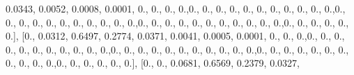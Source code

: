 \documentclass[
]{book}
\newenvironment{Shaded}{\begin{snugshade}}{\end{snugshade}}
\newcommand{\FloatTok}[1]{\textcolor[rgb]{0.00,0.00,0.81}{#1}}
\newcommand{\NormalTok}[1]{#1}
\begin{document}
\begin{Shaded}
\begin{Highlighting}[]
\FloatTok{0.0343}\NormalTok{, }\FloatTok{0.0052}\NormalTok{, }\FloatTok{0.0008}\NormalTok{, }\FloatTok{0.0001}\NormalTok{, }\FloatTok{0.}\NormalTok{, }\FloatTok{0.}\NormalTok{, }\FloatTok{0.}\NormalTok{, }\FloatTok{0.}\NormalTok{,}\FloatTok{0.}\NormalTok{, }\FloatTok{0.}\NormalTok{, }\FloatTok{0.}\NormalTok{, }\FloatTok{0.}\NormalTok{, }\FloatTok{0.}\NormalTok{, }\FloatTok{0.}\NormalTok{, }\FloatTok{0.}\NormalTok{, }\FloatTok{0.}\NormalTok{,}
\FloatTok{0.}\NormalTok{, }\FloatTok{0.}\NormalTok{, }\FloatTok{0.}\NormalTok{,}\FloatTok{0.}\NormalTok{, }\FloatTok{0.}\NormalTok{, }\FloatTok{0.}\NormalTok{, }\FloatTok{0.}\NormalTok{, }\FloatTok{0.}\NormalTok{, }\FloatTok{0.}\NormalTok{, }\FloatTok{0.}\NormalTok{, }\FloatTok{0.}\NormalTok{, }\FloatTok{0.}\NormalTok{, }\FloatTok{0.}\NormalTok{, }\FloatTok{0.}\NormalTok{,}\FloatTok{0.}\NormalTok{, }\FloatTok{0.}\NormalTok{, }\FloatTok{0.}\NormalTok{, }\FloatTok{0.}\NormalTok{, }\FloatTok{0.}\NormalTok{, }\FloatTok{0.}\NormalTok{,}
\FloatTok{0.}\NormalTok{, }\FloatTok{0.}\NormalTok{, }\FloatTok{0.}\NormalTok{, }\FloatTok{0.}\NormalTok{, }\FloatTok{0.}\NormalTok{,}\FloatTok{0.}\NormalTok{, }\FloatTok{0.}\NormalTok{, }\FloatTok{0.}\NormalTok{, }\FloatTok{0.}\NormalTok{, }\FloatTok{0.}\NormalTok{, }\FloatTok{0.}\NormalTok{], [}\FloatTok{0.}\NormalTok{, }\FloatTok{0.0312}\NormalTok{, }\FloatTok{0.6497}\NormalTok{, }\FloatTok{0.2774}\NormalTok{, }\FloatTok{0.0371}\NormalTok{,}
\FloatTok{0.0041}\NormalTok{, }\FloatTok{0.0005}\NormalTok{, }\FloatTok{0.0001}\NormalTok{, }\FloatTok{0.}\NormalTok{, }\FloatTok{0.}\NormalTok{, }\FloatTok{0.}\NormalTok{,}\FloatTok{0.}\NormalTok{, }\FloatTok{0.}\NormalTok{, }\FloatTok{0.}\NormalTok{, }\FloatTok{0.}\NormalTok{, }\FloatTok{0.}\NormalTok{, }\FloatTok{0.}\NormalTok{, }\FloatTok{0.}\NormalTok{, }\FloatTok{0.}\NormalTok{, }\FloatTok{0.}\NormalTok{, }\FloatTok{0.}\NormalTok{,}
\FloatTok{0.}\NormalTok{,}\FloatTok{0.}\NormalTok{, }\FloatTok{0.}\NormalTok{, }\FloatTok{0.}\NormalTok{, }\FloatTok{0.}\NormalTok{, }\FloatTok{0.}\NormalTok{, }\FloatTok{0.}\NormalTok{, }\FloatTok{0.}\NormalTok{, }\FloatTok{0.}\NormalTok{, }\FloatTok{0.}\NormalTok{, }\FloatTok{0.}\NormalTok{, }\FloatTok{0.}\NormalTok{,}\FloatTok{0.}\NormalTok{, }\FloatTok{0.}\NormalTok{, }\FloatTok{0.}\NormalTok{, }\FloatTok{0.}\NormalTok{, }\FloatTok{0.}\NormalTok{, }\FloatTok{0.}\NormalTok{, }\FloatTok{0.}\NormalTok{, }\FloatTok{0.}\NormalTok{,}
\FloatTok{0.}\NormalTok{, }\FloatTok{0.}\NormalTok{, }\FloatTok{0.}\NormalTok{,}\FloatTok{0.}\NormalTok{, }\FloatTok{0.}\NormalTok{, }\FloatTok{0.}\NormalTok{, }\FloatTok{0.}\NormalTok{, }\FloatTok{0.}\NormalTok{, }\FloatTok{0.}\NormalTok{], [}\FloatTok{0.}\NormalTok{, }\FloatTok{0.}\NormalTok{, }\FloatTok{0.0681}\NormalTok{, }\FloatTok{0.6569}\NormalTok{, }\FloatTok{0.2379}\NormalTok{, }\FloatTok{0.0327}\NormalTok{,}

\end{Highlighting}
\end{Shaded}
\end{document}
